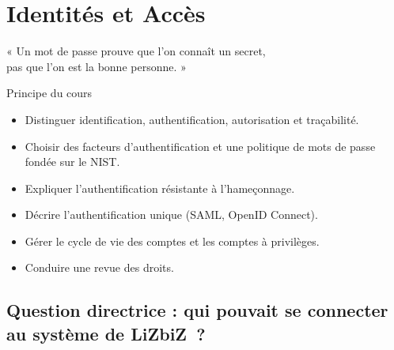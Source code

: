 
\chapter{Identités et Accès}
\label{chap:iam}

\epigraph{%
    « Un mot de passe prouve que l'on connaît un secret,\\
    pas que l'on est la bonne personne. »%
}{Principe du cours}


\begin{boxobjectifs}
\begin{itemize}
    \item Distinguer identification, authentification, autorisation et
          traçabilité.
    \item Choisir des facteurs d'authentification et une politique de mots
          de passe fondée sur le NIST.
    \item Expliquer l'authentification résistante à l'hameçonnage.
    \item Décrire l'authentification unique (SAML, OpenID Connect).
    \item Gérer le cycle de vie des comptes et les comptes à privilèges.
    \item Conduire une revue des droits.
\end{itemize}
\end{boxobjectifs}

\bigskip

\section*{Question directrice : qui pouvait se connecter au système de LiZbiZ~?}


